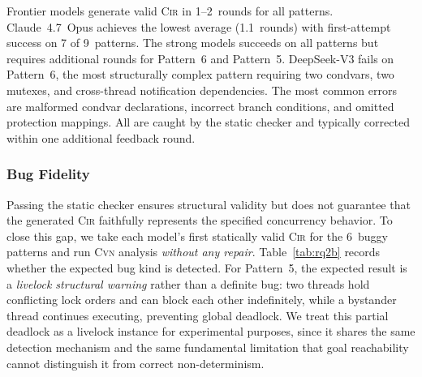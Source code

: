 \documentclass[sigconf]{acmart}
\begin{document}
Frontier models generate valid \textsc{Cir} in 1--2~rounds for all patterns. Claude~4.7~Opus achieves the lowest average (1.1~rounds) with first-attempt success on 7 of 9~patterns. The strong models succeeds on all patterns but requires additional rounds for Pattern~6 and Pattern~5. DeepSeek-V3 fails on Pattern~6, the most structurally complex pattern requiring two condvars, two mutexes, and cross-thread notification dependencies. The most common errors are malformed condvar declarations, incorrect branch conditions, and omitted protection mappings. All are caught by the static checker and typically corrected within one additional feedback round.

\subsubsection{Bug Fidelity}
\label{subsubsec:rq2b}

Passing the static checker ensures structural validity but does not guarantee that the generated \textsc{Cir} faithfully represents the specified concurrency behavior. To close this gap, we take each model's first statically valid \textsc{Cir} for the 6~buggy patterns and run \textsc{Cvn} analysis \emph{without any repair}.
Table~\ref{tab:rq2b} records whether the expected bug kind is detected. For Pattern~5, the expected result is a \emph{livelock structural warning} rather than a definite bug: two threads hold conflicting lock orders and can block each other indefinitely, while a bystander thread continues executing, preventing global deadlock. We treat this partial deadlock as a livelock instance for experimental purposes, since it shares the same detection mechanism and the same fundamental limitation that goal reachability cannot distinguish it from correct non-determinism.
\end{document}

